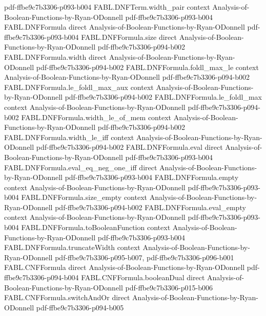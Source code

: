 \begin{theorem}
  {pdf-ffbe9c7b3306-p093-b004}
\proofstep
  {FABL.DNFTerm.width_pair}
  {context}
  {Analysis-of-Boolean-Functions-by-Ryan-ODonnell}
  {pdf-ffbe9c7b3306-p093-b004}
\proofstep
  {FABL.DNFFormula}
  {direct}
  {Analysis-of-Boolean-Functions-by-Ryan-ODonnell}
  {pdf-ffbe9c7b3306-p093-b004}
\proofstep
  {FABL.DNFFormula.size}
  {direct}
  {Analysis-of-Boolean-Functions-by-Ryan-ODonnell}
  {pdf-ffbe9c7b3306-p094-b002}
\proofstep
  {FABL.DNFFormula.width}
  {direct}
  {Analysis-of-Boolean-Functions-by-Ryan-ODonnell}
  {pdf-ffbe9c7b3306-p094-b002}
\proofstep
  {FABL.DNFFormula.foldl_max_le}
  {context}
  {Analysis-of-Boolean-Functions-by-Ryan-ODonnell}
  {pdf-ffbe9c7b3306-p094-b002}
\proofstep
  {FABL.DNFFormula.le_foldl_max_aux}
  {context}
  {Analysis-of-Boolean-Functions-by-Ryan-ODonnell}
  {pdf-ffbe9c7b3306-p094-b002}
\proofstep
  {FABL.DNFFormula.le_foldl_max}
  {context}
  {Analysis-of-Boolean-Functions-by-Ryan-ODonnell}
  {pdf-ffbe9c7b3306-p094-b002}
\proofstep
  {FABL.DNFFormula.width_le_of_mem}
  {context}
  {Analysis-of-Boolean-Functions-by-Ryan-ODonnell}
  {pdf-ffbe9c7b3306-p094-b002}
\proofstep
  {FABL.DNFFormula.width_le_iff}
  {context}
  {Analysis-of-Boolean-Functions-by-Ryan-ODonnell}
  {pdf-ffbe9c7b3306-p094-b002}
\proofstep
  {FABL.DNFFormula.eval}
  {direct}
  {Analysis-of-Boolean-Functions-by-Ryan-ODonnell}
  {pdf-ffbe9c7b3306-p093-b004}
\proofstep
  {FABL.DNFFormula.eval_eq_neg_one_iff}
  {direct}
  {Analysis-of-Boolean-Functions-by-Ryan-ODonnell}
  {pdf-ffbe9c7b3306-p093-b004}
\proofstep
  {FABL.DNFFormula.empty}
  {context}
  {Analysis-of-Boolean-Functions-by-Ryan-ODonnell}
  {pdf-ffbe9c7b3306-p093-b004}
\proofstep
  {FABL.DNFFormula.size_empty}
  {context}
  {Analysis-of-Boolean-Functions-by-Ryan-ODonnell}
  {pdf-ffbe9c7b3306-p094-b002}
\proofstep
  {FABL.DNFFormula.eval_empty}
  {context}
  {Analysis-of-Boolean-Functions-by-Ryan-ODonnell}
  {pdf-ffbe9c7b3306-p093-b004}
\proofstep
  {FABL.DNFFormula.toBooleanFunction}
  {context}
  {Analysis-of-Boolean-Functions-by-Ryan-ODonnell}
  {pdf-ffbe9c7b3306-p093-b004}
\proofstep
  {FABL.DNFFormula.truncateWidth}
  {context}
  {Analysis-of-Boolean-Functions-by-Ryan-ODonnell}
  {pdf-ffbe9c7b3306-p095-b007,
    pdf-ffbe9c7b3306-p096-b001}
\proofstep
  {FABL.CNFFormula}
  {direct}
  {Analysis-of-Boolean-Functions-by-Ryan-ODonnell}
  {pdf-ffbe9c7b3306-p094-b004}
\proofstep
  {FABL.CNFFormula.booleanDual}
  {direct}
  {Analysis-of-Boolean-Functions-by-Ryan-ODonnell}
  {pdf-ffbe9c7b3306-p015-b006}
\proofstep
  {FABL.CNFFormula.switchAndOr}
  {direct}
  {Analysis-of-Boolean-Functions-by-Ryan-ODonnell}
  {pdf-ffbe9c7b3306-p094-b005}

\end{theorem}
